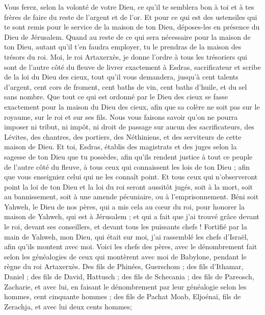 \begin{multicols}{2}
Vous ferez, selon la volonté de votre Dieu, ce qu'il te semblera bon à toi et à tes frères de faire du reste de l'argent et de l'or.
Et pour ce qui est des ustensiles qui te sont remis pour le service de la maison de ton Dieu, déposes-les en présence du Dieu de Jérusalem.
Quand au reste de ce qui sera nécessaire pour la maison de ton Dieu, autant qu'il t'en faudra employer, tu le prendras de la maison des trésors du roi.
Moi, le roi Artaxerxès, je donne l’ordre à tous les trésoriers qui sont de l'autre côté du fleuve de livrer exactement à Esdras, sacrificateur et scribe de la loi du Dieu des cieux, tout qu’il vous demandera,
jusqu'à cent talents d'argent, cent cors de froment, cent baths de vin, cent baths d'huile, et du sel sans nombre.
Que tout ce qui est ordonné par le Dieu des cieux se fasse exactement pour la maison du Dieu des cieux, afin que sa colère ne soit pas sur le royaume, sur le roi et sur ses fils.
Nous vous faisons savoir qu'on ne pourra imposer ni tribut, ni impôt, ni droit de passage sur aucun des sacrificateurs, des Lévites, des chantres, des portiers, des  Néthiniens, et des serviteurs de cette maison de Dieu.
Et toi, Esdras, établis des magistrats et des juges selon la sagesse de ton Dieu que tu possèdes, afin qu'ils rendent justice à tout ce peuple de l'autre côté du fleuve, à tous ceux qui connaissent les lois de ton Dieu ; afin que vous enseigniez celui qui ne les connaît point.
Et tous ceux qui n'observeront point la loi de ton Dieu et la loi du roi seront aussitôt jugés, soit à la mort, soit au bannissement, soit à une amende pécuniaire, ou à l'emprisonnement.
Béni soit Yahweh, le Dieu de nos pères, qui a mis cela au cœur du roi, pour honorer la maison de Yahweh, qui est à Jérusalem ;
et qui a fait que j'ai trouvé grâce devant le  roi, devant ses conseillers, et devant tous les puissants chefs ! Fortifié par la main de Yahweh, mon Dieu, qui était sur moi, j'ai rassemblé les chefs d'Israël, afin qu'ils montent avec moi.
\VerseOne{}Voici les chefs des pères, avec le dénombrement fait selon les généalogies de ceux qui montèrent avec moi de Babylone, pendant le règne du roi Artaxerxès.
Des fils de Phinées, Guerschom ; des fils d'Ithamar, Daniel ; des fils de David, Hattusch ;
des fils de Schecania ; des fils de Pareosch, Zacharie, et avec lui, en faisant le dénombrement par leur généalogie selon les hommes, cent cinquante hommes ;
des fils de Pachat Moab, Eljoénaï, fils de Zerachja, et avec lui deux cents hommes;

\end{multicols}
